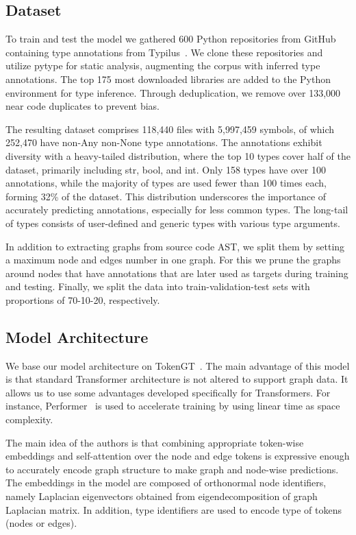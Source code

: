\subsection{Dataset}\label{subsec:dataset}

To train and test the model we gathered 600 Python repositories from GitHub containing type annotations from Typilus~\cite{allamanis2020typilus}.
We clone these repositories and utilize pytype for static analysis, augmenting the corpus with inferred type annotations.
The top 175 most downloaded libraries are added to the Python environment for type inference.
Through deduplication, we remove over 133,000 near code duplicates to prevent bias.

The resulting dataset comprises 118,440 files with 5,997,459 symbols, of which 252,470 have non-Any non-None type annotations.
The annotations exhibit diversity with a heavy-tailed distribution, where the top 10 types cover half of the dataset, primarily including str, bool, and int.
Only 158 types have over 100 annotations, while the majority of types are used fewer than 100 times each, forming 32\% of the dataset.
This distribution underscores the importance of accurately predicting annotations, especially for less common types.
The long-tail of types consists of user-defined and generic types with various type arguments.

In addition to extracting graphs from source code AST, we split them by setting a maximum node and edges number in one graph.
For this we prune the graphs around nodes that have annotations that are later used as targets during training and testing.
Finally, we split the data into train-validation-test sets with proportions of 70-10-20, respectively.

\subsection{Model Architecture}\label{subsec:model-architecture}

We base our model architecture on TokenGT~\cite{kim_pure_2022}.
The main advantage of this model is that standard Transformer architecture is not altered to support graph data.
It allows us to use some advantages developed specifically for Transformers.
For instance, Performer~\cite{choromanski_rethinking_2020} is used to accelerate training by using linear time as space complexity.

The main idea of the authors is that combining appropriate token-wise embeddings and self-attention over the node and edge tokens
is expressive enough to accurately encode graph structure to make graph and node-wise predictions.
The embeddings in the model are composed of orthonormal node identifiers, namely Laplacian eigenvectors obtained from
eigendecomposition of graph Laplacian matrix.
In addition, type identifiers are used to encode type of tokens (nodes or edges).

